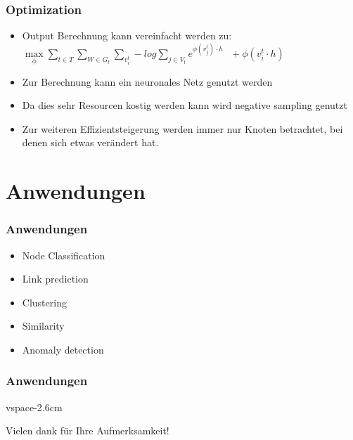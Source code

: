 \documentclass{beamer}
\begin{document}
\begin{frame}
  \frametitle{Optimization}
  \begin{itemize}
    \item Output Berechnung kann vereinfacht werden zu:   
    \(\max\limits_\phi \sum\limits_{t \in T}\sum\limits_{W\in G_t}\sum\limits_{v_i^t} -log\sum\limits_{j\in V_t} e^{\phi(v_j^t)\cdot h}\:\:\: +\phi(v_i^t \cdot h)\)
    \item Zur Berechnung kann ein neuronales Netz genutzt werden
    \item Da dies sehr Resourcen kostig werden kann wird negative sampling genutzt
    \item Zur weiteren Effizientsteigerung werden immer nur Knoten betrachtet, bei denen sich etwas verändert hat.
  \end{itemize}
\end{frame}

\section{Anwendungen}
\begin{frame}
  \frametitle{Anwendungen}
  \begin{itemize}
    \item Node Classification
    \item Link prediction
    \item Clustering
    \item Similarity
    \item Anomaly detection
  \end{itemize}
\end{frame}

\begin{frame}
  \frametitle{Anwendungen}
vspace{-2.6cm}
  \begin{center}
    Vielen dank für Ihre Aufmerksamkeit!
  \end{center}
\end{frame}
\end{document}
